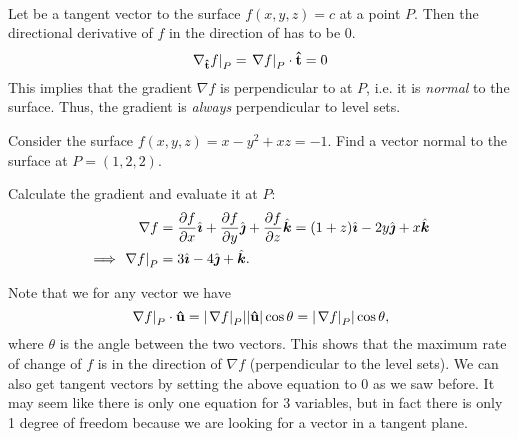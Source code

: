 \documentclass[../multivariate_calculus.tex]{subfiles}
\begin{document}
        \paragraph{}
        Let  be a tangent vector to the surface $f(x,y,z)=c$ at a point $P$.
        Then the directional derivative of $f$ in the direction of  has to be 0.
        \begin{equation}
            \left.\nabla_{\mathbf{\hat{t}}}f\right|_P=\left.\nabla f\right|_P\cdot\mathbf{\hat{t}}=0
        \end{equation}
        This implies that the gradient $\nabla f$ is perpendicular to  at $P$, i.e. it is \textit{normal} to the surface.
        Thus, the gradient is \textit{always} perpendicular to level sets.
        \begin{example}
            Consider the surface $f(x,y,z)=x-y^2+xz=-1$.
            Find a vector normal to the surface at $P=(1,2,2)$.

            Calculate the gradient and evaluate it at $P$:
            \begin{align}
                \nabla f&=\frac{\partial f}{\partial x}\hat{\boldsymbol{\imath}}+\frac{\partial f}{\partial y}\hat{\boldsymbol{\jmath}}+\frac{\partial f}{\partial z}\hat{\boldsymbol{k}}=(1+z)\hat{\boldsymbol{\imath}}-2y\hat{\boldsymbol{\jmath}}+x\hat{\boldsymbol{k}}\\
                \implies\left.\nabla f\right|_P&=3\hat{\boldsymbol{\imath}}-4\hat{\boldsymbol{\jmath}}+\hat{\boldsymbol{k}}.
            \end{align}
        \end{example}
        Note that we for any vector  we have
        \begin{equation}
            \left.\nabla f\right|_P\cdot\mathbf{\hat{u}}=\lvert\left.\nabla f\right|_P\rvert\lvert\mathbf{\hat{u}}\rvert\cos\theta=\lvert\left.\nabla f\right|_P\rvert\cos\theta,
        \end{equation}
        where $\theta$ is the angle between the two vectors.
        This shows that the maximum rate of change of $f$ is in the direction of $\nabla f$ (perpendicular to the level sets).
        We can also get tangent vectors by setting the above equation to 0 as we saw before.
        It may seem like there is only one equation for 3 variables, but in fact there is only 1 degree of freedom because we are looking for a vector in a tangent plane.
\end{document}
